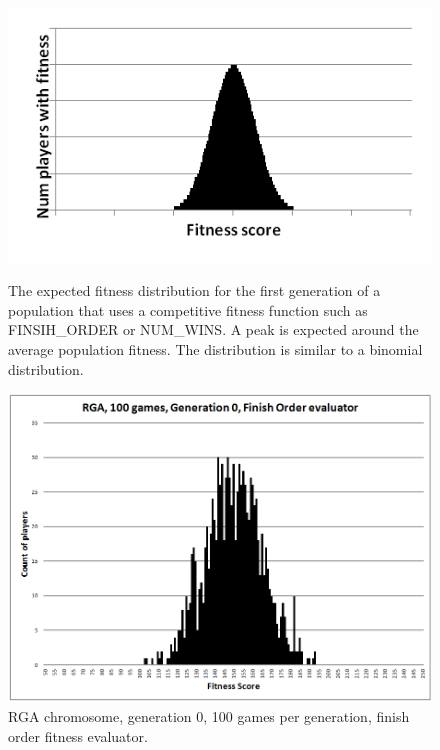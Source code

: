 \begin{figure}
\centering
\begin{minipage}[t]{0.47\linewidth}
\centering
\includegraphics[width=1.0\linewidth]{Figures/binomial.png}
\caption[Binomial Distribution]{The expected fitness distribution for the first
generation of a population that uses a competitive fitness function such as
FINSIH\_ORDER or NUM\_WINS. A peak is expected around the average population
fitness. The distribution is similar to a binomial distribution.}
\label{figure-binomial}
\end{minipage}%
\hspace{0.06\linewidth}%
\begin{minipage}[t]{0.47\linewidth}
\centering
\includegraphics[width=1.0\linewidth]{Figures/RGA_1024_G000_N100_FO.png}
\caption[RGA Finish Order Fitness Distribution, Initial Generation]{RGA
chromosome, generation 0, 100 games per generation, finish order fitness evaluator.}
\label{figure-RGA-G000-N100-FO-initial_fitness}
\end{minipage}
\end{figure}

